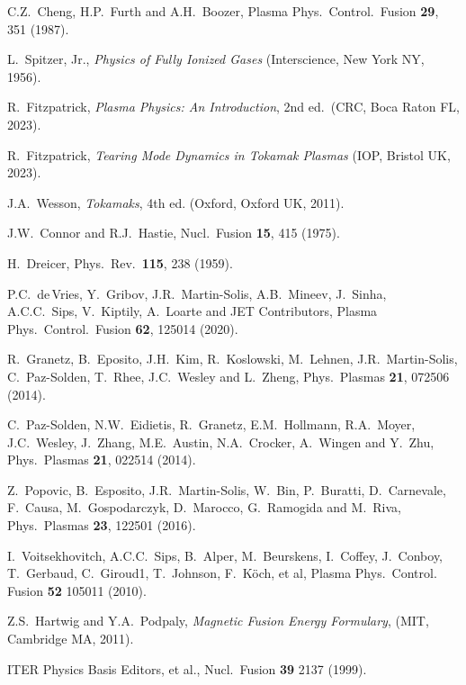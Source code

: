 \documentclass[12pt,prb,aps]{revtex4-1}
\begin{document}
\begin{thebibliography}{99}
 C.Z.~Cheng, H.P.~Furth and A.H.~Boozer, Plasma Phys.\ Control.\ Fusion {\bf 29}, 351 (1987).

 L.~Spitzer, Jr., {\em Physics of Fully Ionized Gases}\/ (Interscience, New York NY, 1956).

 R.~Fitzpatrick, {\em Plasma Physics: An Introduction}, 2nd ed.\ (CRC, Boca Raton FL, 2023).

 R.~Fitzpatrick, {\em Tearing Mode Dynamics in Tokamak Plasmas}\/ (IOP, Bristol UK, 2023).

 J.A.~Wesson, {\em Tokamaks}, 4th ed. (Oxford, Oxford UK, 2011).

 J.W.~Connor and R.J.~Hastie, Nucl.\ Fusion {\bf 15}, 415 (1975).

 H.~Dreicer, Phys.\ Rev.\ {\bf 115}, 238 (1959).

 P.C.~de\,Vries, Y.~Gribov, J.R.~Martin-Solis, A.B.~Mineev, J.~Sinha, A.C.C.~Sips, V.~Kiptily, A.~Loarte and JET Contributors, Plasma Phys.\ Control.\ Fusion
{\bf 62}, 125014 (2020). 

 R.~Granetz, B.~Eposito, J.H.~Kim, R.~Koslowski, M.~Lehnen, J.R.~Martin-Solis, C.~Paz-Solden, T.~Rhee, J.C.~Wesley
and L.~Zheng, Phys.\ Plasmas {\bf 21}, 072506 (2014).

 C.~Paz-Solden,  N.W.~Eidietis,  R.~Granetz, E.M.~Hollmann, R.A.~Moyer, J.C.~Wesley, J.~Zhang, M.E.~Austin, N.A.~Crocker, A.~Wingen and Y.~Zhu, 
 Phys.\ Plasmas {\bf 21}, 022514 (2014).

 Z.~Popovic, B.~Esposito, J.R.~Martin-Solis, W.~Bin,  P.~Buratti, D.~Carnevale, F.~Causa, M.~Gospodarczyk,
D.~Marocco, G.~Ramogida and M.~Riva, Phys.\ Plasmas {\bf 23}, 122501 (2016). 

 I.~Voitsekhovitch, A.C.C.~Sips, B.~Alper, M.~Beurskens, I.~Coffey,
J.~Conboy, T.~Gerbaud, C.~Giroud1, T.~Johnson, F.~K\"{o}ch, et al, Plasma Phys.\ Control. Fusion {\bf 52}  105011 (2010). 

 Z.S.~Hartwig and Y.A.~Podpaly, {\em Magnetic Fusion Energy Formulary}, (MIT, Cambridge MA, 2011).
 
 ITER Physics Basis Editors, et al., Nucl.\ Fusion {\bf 39} 2137 (1999). 
 
\end{thebibliography}
\end{document}
